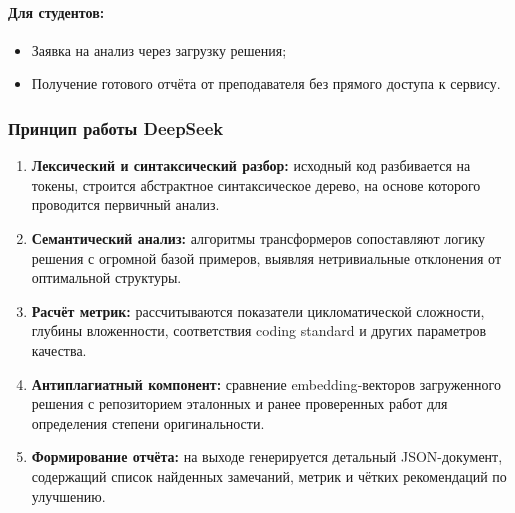 \paragraph{Для студентов:}
\begin{itemize}
  \item Заявка на анализ через загрузку решения;
  \item Получение готового отчёта от преподавателя без прямого доступа к сервису.
\end{itemize}

\subsubsection{Принцип работы DeepSeek}
\begin{enumerate}
  \item \textbf{Лексический и синтаксический разбор:} исходный код разбивается на токены, строится абстрактное синтаксическое дерево, на основе которого проводится первичный анализ.
  \item \textbf{Семантический анализ:} алгоритмы трансформеров сопоставляют логику решения с огромной базой примеров, выявляя нетривиальные отклонения от оптимальной структуры.
  \item \textbf{Расчёт метрик:} рассчитываются показатели цикломатической сложности, глубины вложенности, соответствия coding standard и других параметров качества.
  \item \textbf{Антиплагиатный компонент:} сравнение embedding‐векторов загруженного решения с репозиторием эталонных и ранее проверенных работ для определения степени оригинальности.
  \item \textbf{Формирование отчёта:} на выходе генерируется детальный JSON-документ, содержащий список найденных замечаний, метрик и чётких рекомендаций по улучшению.
\end{enumerate}
